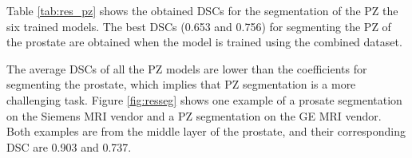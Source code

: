 Table \ref{tab:res_pz} shows the obtained DSCs for the segmentation of the PZ the six trained models.  The best DSCs (0.653 and 0.756) for segmenting the PZ of the prostate are obtained when the model is trained using the combined dataset.  


The average DSCs of all the PZ models are lower than the coefficients for segmenting the prostate, which implies that PZ segmentation is a more challenging task.
Figure \ref{fig:resseg} shows one example of a prosate segmentation on the Siemens MRI vendor and a PZ segmentation on the GE MRI vendor. Both examples are from the middle layer of the prostate, and their corresponding DSC are 0.903 and 0.737.
